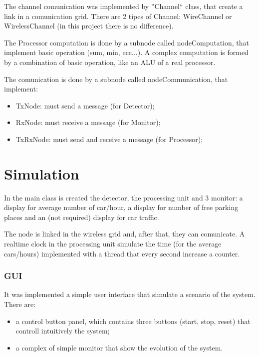 \documentclass[a4paper,titlepage]{article}
\begin{document}
The channel comunication was implemented by ''Channel`` class, that create a link in a comunication grid. There are 2 tipes of Channel: WireChannel or WirelessChannel (in this project there is no difference).

The Processor computation is done by a subnode called nodeComputation, that implement basic operation (sum, min, ecc...). A complex computation is formed by a combination of basic operation, like an ALU of a real processor.

The comunication is done by a subnode called nodeCommunication, that implement:

\begin{itemize}[noitemsep,topsep=20pt,parsep=10pt,partopsep=20pt]

\item TxNode: must send a message (for Detector);

\item RxNode: must receive a message (for Monitor);

\item TxRxNode: must send and receive a message (for Processor);

\end{itemize}


\newpage
\part{Simulation}

In the main class is created the detector, the processing unit and 3 monitor: a display for average number of car/hour, a display for number of free parking places and an (not required) display for car traffic.

The node is linked in the wireless grid and, after that, they can comunicate. A realtime clock in the processing unit simulate the time (for the average cars/hours) implemented with a thread that every second increase a counter. 

\section{GUI}

It was implemented a simple user interface that simulate a scenario of the system. There are:

\begin{itemize}

\item a control button panel, which contains three buttons (start, stop, reset) that controll intuitively the system;
\item a complex of simple monitor that show the evolution of the system.

\end{itemize}
\end{document}
